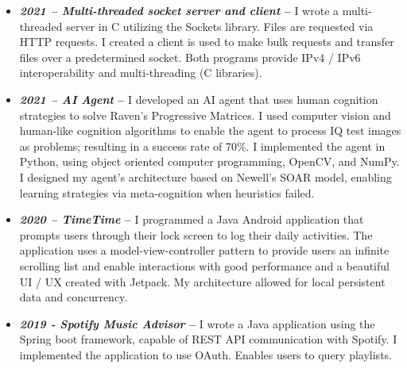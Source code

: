 \documentclass[12pt, letter]{article}
\begin{document}
\begin{itemize}
  \item {\small \textbf{\textit{2021 -- Multi-threaded socket server and client} --} I wrote a multi-threaded server in C utilizing the Sockets library. Files are requested via HTTP requests. I created a client is used to make bulk requests and transfer files over a predetermined socket. Both programs provide IPv4 / IPv6 interoperability and multi-threading (C libraries).}
  \item {\small \textbf{\textit{2021 -- AI Agent} --} I developed an AI agent that uses human cognition strategies to solve Raven's Progressive Matrices. I used computer vision and human-like cognition algorithms to enable the agent to process IQ test images as problems; resulting in a success rate of 70\%. I implemented the agent in Python, using object oriented computer programming, OpenCV, and NumPy. I designed my agent's architecture based on Newell's SOAR model, enabling learning strategies via meta-cognition when heuristics failed.}
  \item {\small \textbf{\textit{2020 -- TimeTime} --} I programmed a Java Android application that prompts users through their lock screen to log their daily activities. The application uses a model-view-controller pattern to provide users an infinite scrolling list and enable interactions with good performance and a beautiful UI / UX created with Jetpack. My architecture allowed for local persistent data and concurrency.}
  \item {\small \textbf{\textit{2019 - Spotify Music Advisor} --} I wrote a Java application using the Spring boot framework, capable of REST API communication with Spotify. I implemented the application to use OAuth. Enables users to query playlists.}
\end{itemize}


\end{document}
